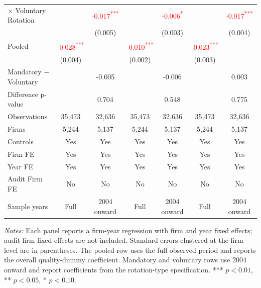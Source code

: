 \documentclass[10pt]{article}
\newcommand{\sym}[1]{\textsuperscript{#1}}
\begin{document}
\begin{minipage}{19cm}
\begin{threeparttable}
\begin{tabular}{l cc cc cc}
$\times$ Voluntary Rotation &  & \textcolor{red}{-0.017\sym{***}} &  & \textcolor{red}{-0.006\sym{*}} &  & \textcolor{red}{-0.017\sym{***}} \\
 &  & (0.005) &  & (0.003) &  & (0.004) \\
Pooled & \textcolor{red}{-0.028\sym{***}} &  & \textcolor{red}{-0.010\sym{***}} &  & \textcolor{red}{-0.023\sym{***}} &  \\
 & (0.004) &  & (0.002) &  & (0.003) &  \\
Mandatory $-$ Voluntary &  & -0.005 &  & -0.006 &  & 0.003 \\
Difference p-value &  & 0.704 &  & 0.548 &  & 0.775 \\
Observations & 35,473 & 32,636 & 35,473 & 32,636 & 35,473 & 32,636 \\
Firms & 5,244 & 5,137 & 5,244 & 5,137 & 5,244 & 5,137 \\
\midrule
Controls & Yes & Yes & Yes & Yes & Yes & Yes \\
Firm FE & Yes & Yes & Yes & Yes & Yes & Yes \\
Year FE & Yes & Yes & Yes & Yes & Yes & Yes \\
Audit Firm FE & No & No & No & No & No & No \\
Sample years & Full & 2004 onward & Full & 2004 onward & Full & 2004 onward \\
\bottomrule
\end{tabular}
\begin{tablenotes}\fontsize{9}{11}\selectfont
\item \fontsize{9}{11}\selectfont \textit{Notes:} Each panel reports a firm-year regression with firm and year fixed effects; audit-firm fixed effects are not included. Standard errors clustered at the firm level are in parentheses. The pooled row uses the full observed period and reports the overall quality-dummy coefficient. Mandatory and voluntary rows use 2004 onward and report coefficients from the rotation-type specification. *** \(p<0.01\), ** \(p<0.05\), * \(p<0.10\).
\end{tablenotes}
\end{threeparttable}

\end{minipage}
\end{document}
